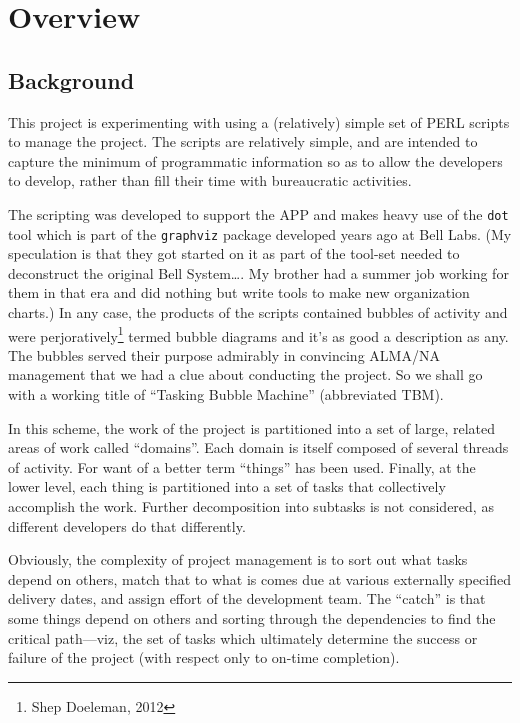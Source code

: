 %
%
\section{Overview}

\subsection{Background}

This project is experimenting with using a (relatively) simple set
of \ac{PERL} scripts to manage the project.  The scripts are relatively
simple, and are intended to capture the minimum of programmatic information
so as to allow the developers to develop, rather than fill their time with
bureaucratic activities.

The scripting was developed to support the \ac{APP} and makes
heavy use of the \texttt{dot} tool which is part of the \texttt{graphviz}
package developed years ago at Bell Labs.  (My speculation is that they
got started on it as part of the tool-set needed to deconstruct the original
Bell System\ldots.  My brother had a summer job working for them in that
era and did nothing but write tools to make new organization charts.)
In any case, the products of the scripts contained bubbles of activity and
were perjoratively\footnote{Shep Doeleman, 2012} termed bubble diagrams and
it's as good a description as any.  The bubbles served their purpose admirably
in convincing ALMA/NA management that we had a clue about conducting the
project.  So we shall go with a working title of ``Tasking Bubble Machine''
(abbreviated \acs{TBM}).

In this scheme, the work of the project is partitioned into a set of large,
related areas of work called ``domains''.  Each domain is itself composed of
several threads of activity.  For want of a better term ``things'' has been
used.   Finally, at the lower level, each thing is partitioned into a set of
tasks that collectively accomplish the work.  Further decomposition into
subtasks is not considered, as different developers do that differently.

Obviously, the complexity of project management is to sort out what tasks
depend on others, match that to what is comes due at various externally
specified delivery dates, and assign effort of the development team.
The ``catch'' is that some things depend on others and sorting through
the dependencies to find the critical path---viz, the set of tasks which
ultimately determine the success or failure of the project (with respect
only to on-time completion).

